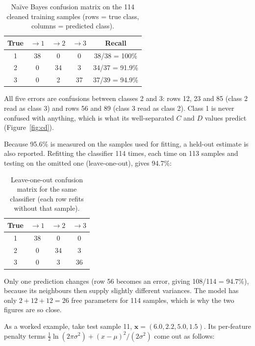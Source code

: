 \begin{table}[htbp]
\centering
\footnotesize
\caption{Na\"ive Bayes confusion matrix on the 114 cleaned training samples (rows = true class, columns = predicted class).}
\begin{tabular}{@{}ccccc@{}}
\toprule
True & $\rightarrow 1$ & $\rightarrow 2$ & $\rightarrow 3$ & Recall \\
\midrule
1 & 38 & 0 & 0 & 38/38 = 100\% \\
2 & 0 & 34 & 3 & 34/37 = 91.9\% \\
3 & 0 & 2 & 37 & 37/39 = 94.9\% \\
\bottomrule
\end{tabular}
\end{table}

All five errors are confusions between classes 2 and 3: rows 12, 23 and 85 (class 2 read as class 3) and rows 56 and 89 (class 3
read as class 2). Class 1 is never confused with anything, which is what its well-separated $C$ and $D$ values predict
(Figure~\ref{fig:cd}).

Because 95.6\% is measured on the samples used for fitting, a held-out estimate is also reported. Refitting the classifier 114
times, each time on 113 samples and testing on the omitted one (leave-one-out), gives 94.7\%:

\begin{table}[htbp]
\centering
\footnotesize
\caption{Leave-one-out confusion matrix for the same classifier (each row refits without that sample).}
\begin{tabular}{@{}cccc@{}}
\toprule
True & $\rightarrow 1$ & $\rightarrow 2$ & $\rightarrow 3$ \\
\midrule
1 & 38 & 0 & 0 \\
2 & 0 & 34 & 3 \\
3 & 0 & 3 & 36 \\
\bottomrule
\end{tabular}
\end{table}

Only one prediction changes (row 56 becomes an error, giving 108/114 = 94.7\%), because its neighbours then supply slightly
different variances. The model has only $2 + 12 + 12 = 26$ free parameters for 114 samples, which is why the two figures are so
close.

As a worked example, take test sample 11, $\mathbf{x} = (6.0, 2.2, 5.0, 1.5)$. Its per-feature penalty terms
$\tfrac{1}{2}\ln(2\pi\sigma^2) + (x-\mu)^2/(2\sigma^2)$ come out as follows:

